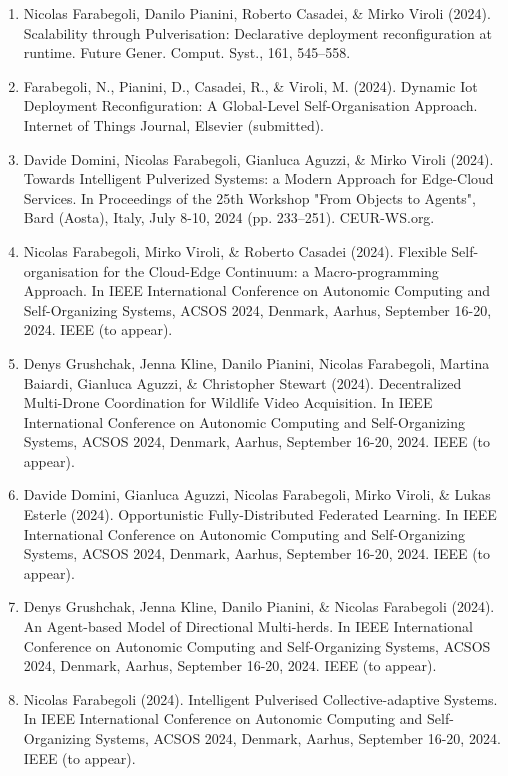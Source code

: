 \documentclass[runningheads]{llncs}
\begin{document}
\begin{enumerate}
    \item Nicolas Farabegoli, Danilo Pianini, Roberto Casadei, \& Mirko Viroli (2024). Scalability through Pulverisation: Declarative deployment reconfiguration at runtime. Future Gener. Comput. Syst., 161, 545–558.    
    \item Farabegoli, N., Pianini, D., Casadei, R., \& Viroli, M. (2024). Dynamic Iot Deployment Reconfiguration: A Global-Level Self-Organisation Approach. Internet of Things Journal, Elsevier (submitted).
    \item Davide Domini, Nicolas Farabegoli, Gianluca Aguzzi, \& Mirko Viroli (2024). Towards Intelligent Pulverized Systems: a Modern Approach for Edge-Cloud Services. In Proceedings of the 25th Workshop "From Objects to Agents", Bard (Aosta), Italy, July 8-10, 2024 (pp. 233–251). CEUR-WS.org.
    \item Nicolas Farabegoli, Mirko Viroli, \& Roberto Casadei (2024). Flexible Self-organisation for the Cloud-Edge Continuum: a Macro-programming Approach. In IEEE International Conference on Autonomic Computing and Self-Organizing Systems, ACSOS 2024, Denmark, Aarhus, September 16-20, 2024. IEEE (to appear).
    \item Denys Grushchak, Jenna Kline, Danilo Pianini, Nicolas Farabegoli, Martina Baiardi, Gianluca Aguzzi, \& Christopher Stewart (2024). Decentralized Multi-Drone Coordination for Wildlife Video Acquisition. In IEEE International Conference on Autonomic Computing and Self-Organizing Systems, ACSOS 2024, Denmark, Aarhus, September 16-20, 2024. IEEE (to appear).   
    \item Davide Domini, Gianluca Aguzzi, Nicolas Farabegoli, Mirko Viroli, \& Lukas Esterle (2024). Opportunistic Fully-Distributed Federated Learning. In IEEE International Conference on Autonomic Computing and Self-Organizing Systems, ACSOS 2024, Denmark, Aarhus, September 16-20, 2024. IEEE (to appear).
    \item Denys Grushchak, Jenna Kline, Danilo Pianini, \& Nicolas Farabegoli (2024). An Agent-based Model of Directional Multi-herds. In IEEE International Conference on Autonomic Computing and Self-Organizing Systems, ACSOS 2024, Denmark, Aarhus, September 16-20, 2024. IEEE (to appear).
    \item Nicolas Farabegoli (2024). Intelligent Pulverised Collective-adaptive Systems. In IEEE International Conference on Autonomic Computing and Self-Organizing Systems, ACSOS 2024, Denmark, Aarhus, September 16-20, 2024. IEEE (to appear).
\end{enumerate}
\end{document}
